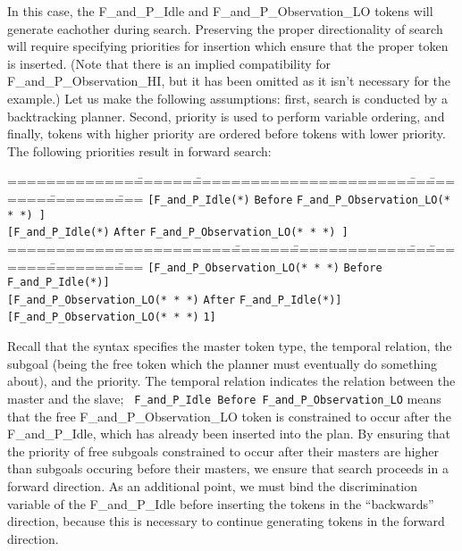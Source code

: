 In this case, the F\_and\_P\_Idle and F\_and\_P\_Observation\_LO
tokens will generate eachother during search.  Preserving the proper
directionality of search will require specifying priorities for
insertion which ensure that the proper token is inserted.  (Note that
there is an implied compatibility for F\_and\_P\_Observation\_HI, but
it has been omitted as it isn't necessary for the example.)  Let us
make the following assumptions: first, search is conducted by a
backtracking planner.  Second, priority is used to perform variable
ordering, and finally, tokens with higher priority are ordered before
tokens with lower priority.  The following priorities result in 
forward search:

\begin{tabbing}
=============\=======\=======================\===\========\========\====\kill
{\tt[F\_and\_P\_Idle(*)} \> {\tt Before} \> {\tt  F\_and\_P\_Observation\_LO(* * *) ]}  \\
{\tt[F\_and\_P\_Idle(*)} \> {\tt After} \> {\tt  F\_and\_P\_Observation\_LO(* * *) ]}  \\
=======================\=======\=============\===\========\========\====\kill
{\tt[F\_and\_P\_Observation\_LO(* * *)} \> {\tt Before} \> {\tt  F\_and\_P\_Idle(*)]}  \\
{\tt[F\_and\_P\_Observation\_LO(* * *)} \> {\tt After} \> {\tt  F\_and\_P\_Idle(*)]}  \\
{\tt[F\_and\_P\_Observation\_LO(* * *)} \> {\tt 1]}  \\
\end{tabbing}

Recall that the syntax specifies the master token type, the temporal
relation, the subgoal (being the free token which the planner must
eventually do something about), and the priority.  The temporal
relation indicates the relation between the master and the slave; {\tt
F\_and\_P\_Idle Before F\_and\_P\_Observation\_LO} means that the free
F\_and\_P\_Observation\_LO token is constrained to occur after the
F\_and\_P\_Idle, which has already been inserted into the plan.  By
ensuring that the priority of free subgoals constrained to occur
after their masters are higher than subgoals occuring before their
masters, we ensure that search proceeds in a forward direction.
As an additional point, we must bind the discrimination variable
of the F\_and\_P\_Idle  before inserting the tokens in the
``backwards'' direction, because this is necessary to continue
generating tokens in the forward direction.

